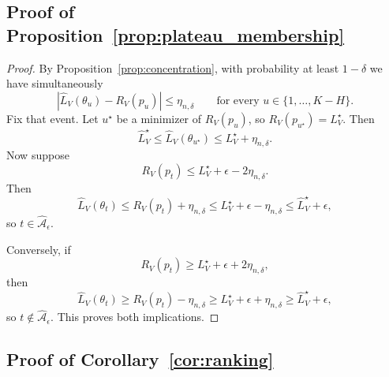 \documentclass{article}
\begin{document}
\subsection{Proof of Proposition~\ref{prop:plateau_membership}}

\begin{proof}
By Proposition~\ref{prop:concentration}, with probability at least $1-\delta$ we have simultaneously
\begin{equation}
    |\hat L_V(\theta_u)-R_V(p_u)|
    \le
    \eta_{n,\delta}
    \qquad
    \text{for every } u\in\{1,\dots,K-H\}.
\end{equation}
Fix that event. Let $u^\star$ be a minimizer of $R_V(p_u)$, so $R_V(p_{u^\star})=L_V^\star$. Then
\begin{equation}
    \hat L_V^\star
    \le
    \hat L_V(\theta_{u^\star})
    \le
    L_V^\star + \eta_{n,\delta}.
\end{equation}
Now suppose
\begin{equation}
    R_V(p_t) \le L_V^\star + \epsilon - 2\eta_{n,\delta}.
\end{equation}
Then
\begin{equation}
    \hat L_V(\theta_t)
    \le
    R_V(p_t) + \eta_{n,\delta}
    \le
    L_V^\star + \epsilon - \eta_{n,\delta}
    \le
    \hat L_V^\star + \epsilon,
\end{equation}
so $t\in\widehat{\mathcal{A}}_{\epsilon}$.

Conversely, if
\begin{equation}
    R_V(p_t) \ge L_V^\star + \epsilon + 2\eta_{n,\delta},
\end{equation}
then
\begin{equation}
    \hat L_V(\theta_t)
    \ge
    R_V(p_t) - \eta_{n,\delta}
    \ge
    L_V^\star + \epsilon + \eta_{n,\delta}
    \ge
    \hat L_V^\star + \epsilon,
\end{equation}
so $t\notin\widehat{\mathcal{A}}_{\epsilon}$. This proves both implications.
\end{proof}

\subsection{Proof of Corollary~\ref{cor:ranking}}
\end{document}
